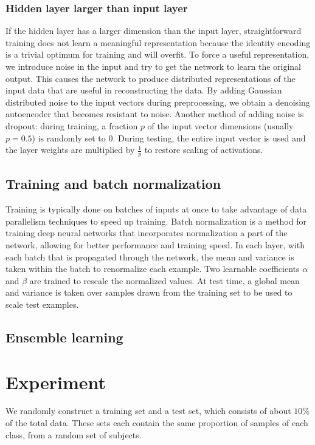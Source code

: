 \documentclass{article} %
\begin{document}
\subsubsection{Hidden layer larger than input layer}
If the hidden layer has a larger dimension than the input layer, straightforward training does not learn a meaningful representation because the identity encoding is a trivial optimum for training and will overfit. To force a useful representation, we introduce noise in the input and try to get the network to learn the original output. This causes the network to produce distributed representations of the input data that are useful in reconstructing the data. By adding Gaussian distributed noise to the input vectors during preprocessing, we obtain a denoising autoencoder that becomes resistant to noise. Another method of adding noise is dropout: during training, a fraction $p$ of the input vector dimensions (usually $p = 0.5$) is randomly set to $0$. During testing, the entire input vector is used and the layer weights are multiplied by $\frac{1}{p}$ to restore scaling of activations.

\subsection{Training and batch normalization}
Training is typically done on batches of inputs at once to take advantage of data parallelism techniques to speed up training.
Batch normalization \cite{DBLP:journals/corr/IoffeS15} is a method for training deep neural networks that incorporates normalization a part of the network, allowing for better performance and training speed. In each layer, with each batch that is propagated through the network, the mean and variance is taken within the batch to renormalize each example. Two learnable coefficients $\alpha$ and $\beta$ are trained to rescale the normalized values.
At test time, a global mean and variance is taken over samples drawn from the training set to be used to scale test examples.

\subsection{Ensemble learning}

\section{Experiment} \label{section:experiment}
We randomly construct a training set and a test set, which consists of about $10\%$ of the total data.  These sets each contain the same proportion of samples of each class, from a random set of subjects.
\end{document}
